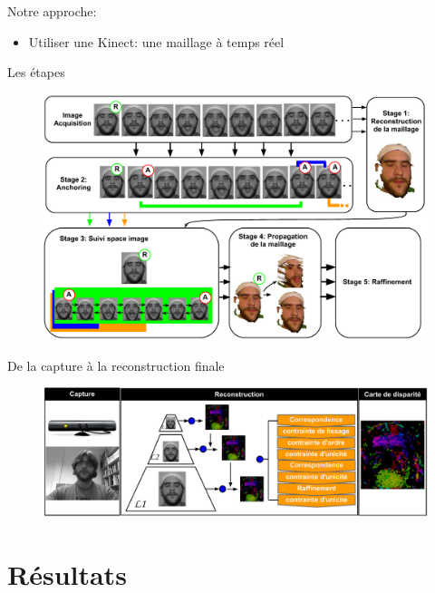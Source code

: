 \documentclass[compress,pdf,11pt,xcolor=dvipsnames]{beamer}
\begin{document}
\begin{frame}{}
  \begin{alertblock}{Notre approche:}
    \begin{itemize}
    \item Utiliser une Kinect: une maillage à temps réel
    \end{itemize}
  \end{alertblock}
\end{frame}


\begin{frame}{Les étapes}
\begin{figure}[ht!]
  \begin{center}
    \includegraphics[width=\textwidth]{img/projDiagram}
  \end{center}
\end{figure}
\end{frame}


\begin{frame}{De la capture à la reconstruction finale}
\begin{figure}[ht!]
    \includegraphics[width=\textwidth]{img/projSystem}
\end{figure}
\end{frame}

\section{Résultats}
\end{document}
